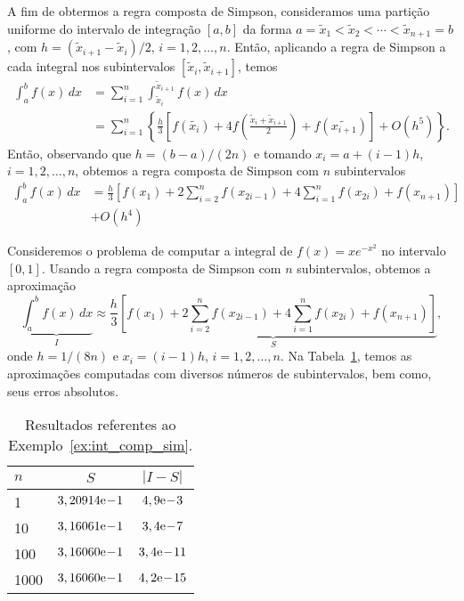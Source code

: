 A fim de obtermos a regra composta de Simpson, consideramos uma partição uniforme do intervalo de integração $[a, b]$ da forma $a=\tilde{x}_1 < \tilde{x}_2 < \cdots < \tilde{x}_{n+1}=b$, com $h=(\tilde{x}_{i+1}-\tilde{x}_{i})/2$, $i=1, 2, \dotsc, n$. Então, aplicando a regra de Simpson a cada integral nos subintervalos $[\tilde{x}_i, \tilde{x}_{i+1}]$, temos
\begin{align}
  \int_a^b f(x)\,dx &= \sum_{i=1}^{n}\int_{\tilde{x}_i}^{\tilde{x}_{i+1}}f(x)\,dx\\
  &= \sum_{i=1}^n \left\{\frac{h}{3}\left[f(\tilde{x_i}) + 4f\left(\frac{\tilde{x}_i+\tilde{x}_{i+1}}{2}\right) + f(\tilde{x_{i+1}})\right] + O(h^5)\right\}.
\end{align}
Então, observando que $h=(b-a)/(2n)$ e tomando $x_i=a+(i-1)h$, $i=1, 2, \dotsc, n$, obtemos a regra composta de Simpson com $n$ subintervalos
\begin{align}
  \int_a^b f(x)\,dx &= \frac{h}{3}\left[f(x_1) + 2\sum_{i=2}^{n} f(x_{2i-1}) + 4\sum_{i=1}^{n} f(x_{2i}) + f(x_{n+1})\right] \nonumber\\
  &+ O(h^4)
\end{align}

\begin{ex}\label{ex:int_comp_sim}
  Consideremos o problema de computar a integral de $f(x)=xe^{-x^2}$ no intervalo $[0, 1]$. Usando a regra composta de Simpson com $n$ subintervalos, obtemos a aproximação
  \begin{equation}
    \underbrace{\int_a^b f(x)\,dx}_{I} \approx \underbrace{\frac{h}{3}\left[f(x_1) + 2\sum_{i=2}^{n} f(x_{2i-1}) + 4\sum_{i=1}^{n} f(x_{2i}) + f(x_{n+1})\right]}_{S},
  \end{equation}
onde $h=1/(8n)$ e $x_i = (i-1)h$, $i=1, 2, \dotsc, n$. Na Tabela~\ref{tab:ex_int_comp_sim}, temos as aproximações computadas com diversos números de subintervalos, bem como, seus erros absolutos.

\begin{table}[h!]
  \centering
  \caption{Resultados referentes ao Exemplo~\ref{ex:int_comp_sim}.}
  \begin{tabular}{l|cc}
    $n$ & $S$ & $|I-S|$ \\\hline
    1   & $3,20914\mathrm{e}\!-\!1$ & $4,9\mathrm{e}\!-\!3$ \\
    10  & $3,16061\mathrm{e}\!-\!1$ & $3,4\mathrm{e}\!-\!7$ \\
    100 & $3,16060\mathrm{e}\!-\!1$ & $3,4\mathrm{e}\!-\!11$ \\
    1000& $3,16060\mathrm{e}\!-\!1$ & $4,2\mathrm{e}\!-\!15$ \\\hline
  \end{tabular}
  \label{tab:ex_int_comp_sim}
\end{table}

\end{ex}


